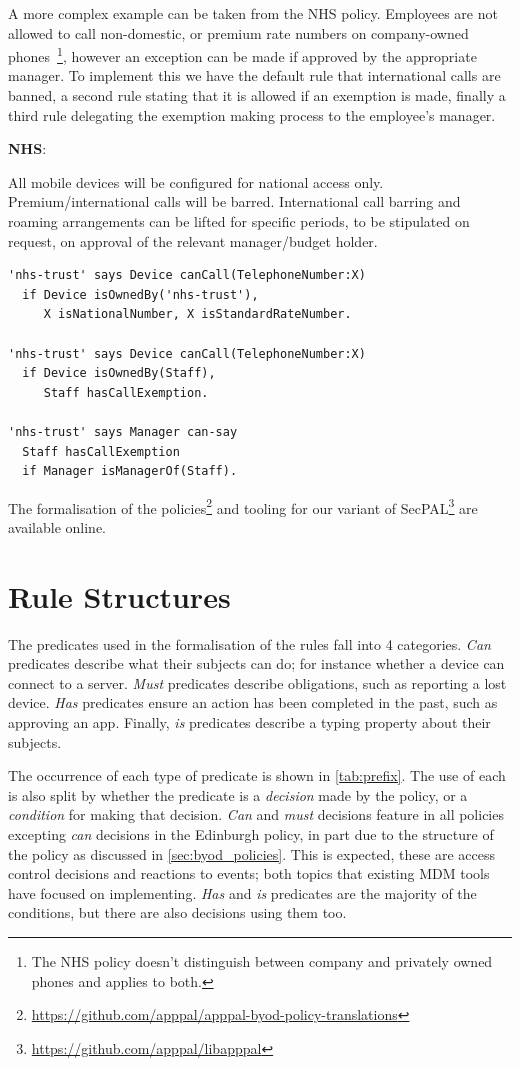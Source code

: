 \documentclass[conference,twocolumn]{IEEEtran}
\newenvironment{policyrule}[1]{%
  \begin{mdframed}[innerbottommargin=0]\footnotesize
    \noindent\textbf{\sffamily #1}:~\itshape%
  }{%
  \end{mdframed}
}
\begin{document}
A more complex example can be taken from the NHS policy.
Employees are not allowed to call non-domestic, or premium rate numbers on
company-owned phones~\footnote{The NHS policy doesn't distinguish between
  company and privately owned phones and applies to both.}, however an exception can be made if approved by the appropriate manager.
To implement this we have the default rule that international calls are banned, a second rule stating that it is allowed if an exemption is made, finally a third rule delegating the exemption making process to the employee's manager.
\begin{policyrule}{NHS}
  All mobile devices will be configured for national access only. Premium/international calls will be barred.
  International call barring and roaming arrangements can be lifted for specific periods, to be stipulated on request, on approval of the relevant manager/budget holder.
  \begin{lstlisting}
'nhs-trust' says Device canCall(TelephoneNumber:X)
  if Device isOwnedBy('nhs-trust'),
     X isNationalNumber, X isStandardRateNumber.

'nhs-trust' says Device canCall(TelephoneNumber:X)
  if Device isOwnedBy(Staff),
     Staff hasCallExemption.

'nhs-trust' says Manager can-say
  Staff hasCallExemption
  if Manager isManagerOf(Staff).
  \end{lstlisting}
\end{policyrule}

The formalisation of the policies\footnote{\url{https://github.com/apppal/apppal-byod-policy-translations}} and tooling for our variant of SecPAL\footnote{\url{https://github.com/apppal/libapppal}} are available online.

\section{Rule Structures}

The predicates used in the formalisation of the rules fall into 4 categories.
\emph{Can} predicates describe what their subjects can do; for instance whether a device can connect to a server.
\emph{Must} predicates describe obligations, such as reporting a lost device.
\emph{Has} predicates ensure an action has been completed in the past, such as approving an app.
Finally, \emph{is} predicates describe a typing property about their subjects.

The occurrence of each type of predicate is shown in \autoref{tab:prefix}.
The use of each is also split by whether the predicate is a \emph{decision} made by the policy, or a \emph{condition} for making that decision.
\emph{Can} and \emph{must} decisions feature in all policies excepting \emph{can} decisions in the Edinburgh policy, in part due to the structure of the policy as discussed in \autoref{sec:byod_policies}.
This is expected, these are access control decisions and reactions to events; both topics that existing MDM tools have focused on implementing.
\emph{Has} and \emph{is} predicates are the majority of the conditions, but there are also decisions using them too.
\end{document}
